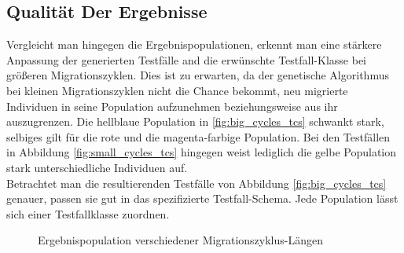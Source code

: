 \documentclass[12pt,a4paper]{article}
\begin{document}
\subsection{Qualität Der Ergebnisse}
Vergleicht man hingegen die Ergebnispopulationen, erkennt man eine stärkere Anpassung der generierten Testfälle and die erwünschte Testfall-Klasse bei größeren Migrationszyklen. Dies ist zu erwarten, da der genetische Algorithmus bei kleinen Migrationszyklen nicht die Chance bekommt, neu migrierte Individuen in seine Population aufzunehmen beziehungsweise aus ihr auszugrenzen. Die hellblaue Population in \ref{fig:big_cycles_tcs} schwankt stark, selbiges gilt für die rote und die magenta-farbige Population. Bei den Testfällen in Abbildung \ref{fig:small_cycles_tcs} hingegen weist lediglich die gelbe Population stark unterschiedliche Individuen auf.\\
Betrachtet man die resultierenden Testfälle von Abbildung \ref{fig:big_cycles_tcs} genauer, passen sie gut in das spezifizierte Testfall-Schema. Jede Population lässt sich einer Testfallklasse zuordnen.

\begin{figure}
\centering
{}
\caption{Ergebnispopulation verschiedener Migrationszyklus-Längen}
\end{figure}
\end{document}
